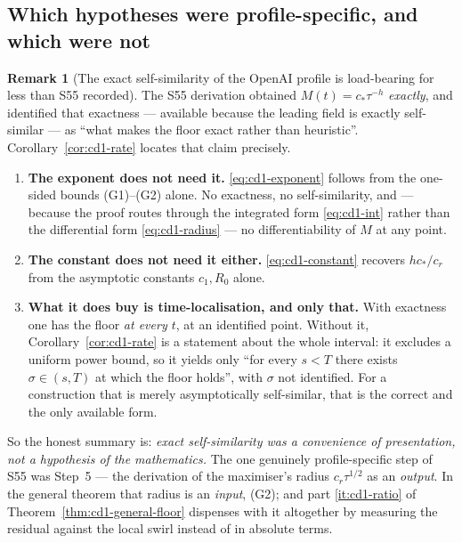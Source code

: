 \documentclass[11pt]{article}
\theoremstyle{definition}
\newtheorem{remark}[theorem]{Remark}
\theoremstyle{remark}
\begin{document}
\subsection{Which hypotheses were profile-specific, and which were not}
\label{subsec:cd1-audit}

\begin{remark}[The exact self-similarity of the OpenAI profile is
  load-bearing for less than S55 recorded]\label{rem:cd1-selfsimilar}
  The S55 derivation obtained $M(t)=c_*\tau^{-h}$ \emph{exactly}, and
  identified that exactness --- available because the leading field is
  exactly self-similar --- as ``what makes the floor exact rather than
  heuristic''. Corollary~\ref{cor:cd1-rate} locates that claim precisely.
  \begin{enumerate}[label=(\alph*),leftmargin=2.2em]
    \item \textbf{The exponent does not need it.} \eqref{eq:cd1-exponent}
      follows from the one-sided bounds (G1)--(G2) alone. No exactness, no
      self-similarity, and --- because the proof routes through the
      integrated form \eqref{eq:cd1-int} rather than the differential form
      \eqref{eq:cd1-radius} --- no differentiability of $M$ at any point.
    \item \textbf{The constant does not need it either.}
      \eqref{eq:cd1-constant} recovers $hc_*/c_r$ from the asymptotic
      constants $c_1,R_0$ alone.
    \item \textbf{What it does buy is time-localisation, and only that.}
      With exactness one has the floor \emph{at every $t$}, at an identified
      point. Without it, Corollary~\ref{cor:cd1-rate} is a statement about
      the whole interval: it excludes a uniform power bound, so it yields
      only ``for every $s<T$ there exists $\sigma\in(s,T)$ at which the floor
      holds'', with $\sigma$ not identified. For a construction that is
      merely asymptotically self-similar, that is the correct and the only
      available form.
  \end{enumerate}
  So the honest summary is: \emph{exact self-similarity was a convenience of
  presentation, not a hypothesis of the mathematics.} The one genuinely
  profile-specific step of S55 was Step~5 --- the derivation of the
  maximiser's radius $c_r\tau^{1/2}$ as an \emph{output}. In the general
  theorem that radius is an \emph{input}, (G2); and part
  \ref{it:cd1-ratio} of Theorem~\ref{thm:cd1-general-floor} dispenses with it
  altogether by measuring the residual against the local swirl instead of in
  absolute terms.
\end{remark}
\end{document}
